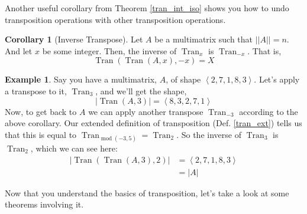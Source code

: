 \documentclass[12pt]{book}
\theoremstyle{plain}
\theoremstyle{definition}
\newtheorem{corollary}{Corollary}[theorem]
\newtheorem{example}{Example}[chapter]
\theoremstyle{ppart}
\theoremstyle{case}
\theoremstyle{solution}
\DeclareMathOperator{\Tran}{Tran}
\DeclareMathOperator{\remainder}{mod}
\begin{document}
Another useful corollary from Theorem \ref{tran_int_iso} shows you how to
undo transposition operations with other transposition operations.

\begin{corollary}[Inverse Transpose]
Let $A$ be a multimatrix such that $||A|| = n$. And let
$x$ be some integer. Then, the inverse of $\Tran_x$ is
$\Tran_{-x}$. That is,
\[ \Tran(\Tran(A, x), -x) = X \]
\end{corollary}

\begin{example}
Say you have a multimatrix, $A$, of shape $\left<2,7,1,8,3\right>$.
Let's apply a transpose to it, $\Tran_3$, and we'll get the shape,
\[ |\Tran(A, 3)| = \left<8,3,2,7,1\right> \]
Now, to get back to $A$ we can apply another transpose $\Tran_{-3}$ according
to the above corollary.
Our extended definition of transposition (Def. \ref{tran_ext})
tells us that this is equal to $\Tran_{\remainder(-3, 5)} = \Tran_{2}$.
So the inverse of $\Tran_3$ is $\Tran_2$, which we can see here:
\begin{align*}
  |\Tran(\Tran(A, 3), 2)|
  &= \left<2,7,1,8,3\right> \\
  &= |A|
\end{align*}
\end{example}

Now that you understand the basics of transposition, let's take a look
at some theorems involving it.
\end{document}
